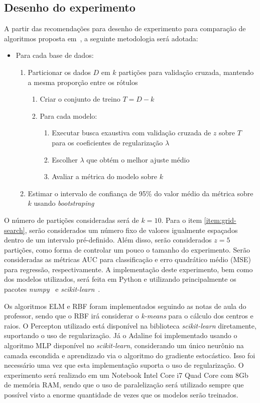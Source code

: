 \documentclass[conference]{IEEEtran}
\begin{document}
	\subsection{Desenho do experimento}
	A partir das recomendações para desenho de experimento para comparação de algoritmos proposta em~\cite{salzberg1997comparing}, a seguinte metodologia será adotada:
	\begin{itemize}
		\item Para cada base de dados:
			\begin{enumerate}
			\item Particionar os dados $D$ em $k$ partições para validação cruzada, mantendo a mesma proporção entre os rótulos
			\begin{enumerate}
				\item Criar o conjunto de treino $T = D - k$
				\item Para cada modelo:
				\begin{enumerate}
					\item Executar busca exaustiva com validação cruzada de $z$ sobre $T$ para os coeficientes de regularização $\lambda$ \label{item:grid-search}
					\item Escolher $\lambda$ que obtém o melhor ajuste médio 
					\item Avaliar a métrica do modelo sobre $k$
				\end{enumerate}
			\end{enumerate}
			\item Estimar o intervalo de confiança de 95\% do valor médio da métrica sobre $k$ usando \textit{bootstraping}
		\end{enumerate}
	\end{itemize}
	
	O número de partições consideradas será de $k=10$. Para o item \ref{item:grid-search}, serão considerados um número fixo de valores igualmente espaçados dentro de um intervalo pré-definido. Além disso, serão considerados $z=5$ partições, como forma de controlar um pouco o tamanho do experimento. Serão consideradas as métricas AUC para classificação e erro quadrático médio (MSE) para regressão, respectivamente. A implementação deste experimento, bem como dos modelos utilizados, será feita em Python e utilizando principalmente os pacotes \textit{numpy}~\cite{harris2020array} e \textit{scikit-learn}~\cite{scikit-learn}. 
	
	Os algoritmos ELM e RBF foram implementados seguindo as notas de aula do professor, sendo que o RBF irá considerar o \textit{k-means} para o cálculo dos centros e raios. O Percepton utilizado está disponível na biblioteca \textit{scikit-learn} diretamente, suportando o uso de regularização. Já o Adaline foi implementado usando o algoritmo MLP disponível no \textit{scikit-learn}, considerando um único neurônio na camada escondida e aprendizado via o algoritmo do gradiente estocástico. Isso foi necessário uma vez que esta implementação suporta o uso de regularização. O experimento será realizado em um Notebook Intel Core i7 Quad Core com 8Gb de memória RAM, sendo que o uso de paralelização será utilizado sempre que possível visto a enorme quantidade de vezes que os modelos serão treinados.
	
\end{document}
